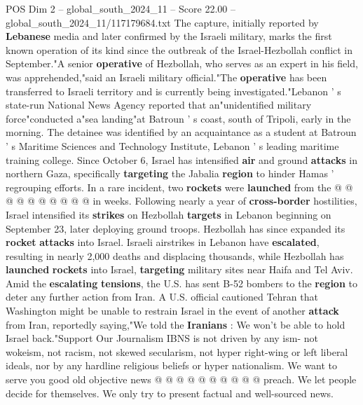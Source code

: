 \begin{textsample}{POS Dim 2 – global\_south\_2024\_11 – Score 22.00 – global\_south\_2024\_11/117179684.txt}
The capture, initially reported by \textbf{Lebanese} media and later confirmed by the Israeli military, marks the first known operation of its kind since the outbreak of the Israel-Hezbollah conflict in September."A senior \textbf{operative} of Hezbollah, who serves as an expert in his field, was apprehended,"said an Israeli military official."The \textbf{operative} has been transferred to Israeli territory and is currently being investigated."Lebanon ' s state-run National News Agency reported that an"unidentified military force"conducted a"sea landing"at Batroun ' s coast, south of Tripoli, early in the morning.
The detainee was identified by an acquaintance as a student at Batroun ' s Maritime Sciences and Technology Institute, Lebanon ' s leading maritime training college.
Since October 6, Israel has intensified \textbf{air} and ground \textbf{attacks} in northern Gaza, specifically \textbf{targeting} the Jabalia \textbf{region} to hinder Hamas ' regrouping efforts.
In a rare incident, two \textbf{rockets} were \textbf{launched} from the @ @ @ @ @ @ @ @ @ @ in weeks.
Following nearly a year of \textbf{cross-border} hostilities, Israel intensified its \textbf{strikes} on Hezbollah \textbf{targets} in Lebanon beginning on September 23, later deploying ground troops.
Hezbollah has since expanded its \textbf{rocket} \textbf{attacks} into Israel.
Israeli airstrikes in Lebanon have \textbf{escalated}, resulting in nearly 2,000 deaths and displacing thousands, while Hezbollah has \textbf{launched} \textbf{rockets} into Israel, \textbf{targeting} military sites near Haifa and Tel Aviv.
Amid the \textbf{escalating} \textbf{tensions}, the U.S. has sent B-52 bombers to the \textbf{region} to deter any further action from Iran.
A U.S. official cautioned Tehran that Washington might be unable to restrain Israel in the event of another \textbf{attack} from Iran, reportedly saying,"We told the \textbf{Iranians} : We won't be able to hold Israel back."Support Our Journalism IBNS is not driven by any ism- not wokeism, not racism, not skewed secularism, not hyper right-wing or left liberal ideals, nor by any hardline religious beliefs or hyper nationalism.
We want to serve you good old objective news @ @ @ @ @ @ @ @ @ @ preach.
We let people decide for themselves.
We only try to present factual and well-sourced news.

\end{textsample}
